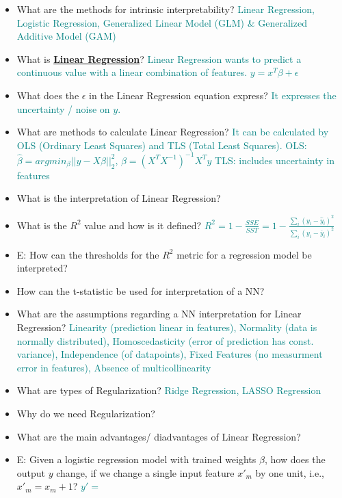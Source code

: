 \documentclass{report}
\newcommand{\asw}[2][teal]{}
\renewcommand{\asw}[2][teal]{\textcolor{#1}{#2}}
\begin{document}
	\begin{itemize}
	\item What are the methods for intrinsic interpretability?
	\asw{\newline Linear Regression, Logistic Regression, Generalized Linear Model (GLM) \& Generalized Additive Model (GAM)}
	
	\item What is \textbf{\underline{Linear Regression}}?
	\asw{\newline Linear Regression wants to predict a continuous value with a linear combination of features.
	\newline $y = x^T \beta + \epsilon$}
	\item What does the $\epsilon$ in the Linear Regression equation express?
	\asw{\newline It expresses the uncertainty / noise on $y$.}
	\item What are methods to calculate Linear Regression?
	\asw{\newline It can be calculated by OLS (Ordinary Least Squares) and TLS (Total Least Squares).
	\newline OLS: $\hat{\beta} = argmin_\beta ||y - X \beta||^2_2$, $\hat{\beta} = (X^T X^{-1})^{-1} X^T y$
	\newline TLS: includes uncertainty in features}
	\item What is the interpretation of Linear Regression?
	\asw{\newline }
	\item What is the $R^2$ value and how is it defined?
	\asw{\newline $R^2 = 1 - \frac{SSE}{SST} = 1 - \frac{\sum_{i} (y_i - \hat{y}_i)^2}{\sum_i (y_i - \overline{y}_i)^2}$}
	\item E: How can the thresholds for the $R^2$ metric for a regression model be interpreted?
	\asw{\newline }
	\item How can the t-statistic be used for interpretation of a NN?
	\asw{\newline }
	\item What are the assumptions regarding a NN interpretation for Linear Regression?
	\asw{\newline Linearity (prediction linear in features), Normality (data is normally distributed), Homoscedasticity (error of prediction has const. variance), Independence (of datapoints), Fixed Features (no measurment error in features), Absence of multicollinearity}
	\item What are types of Regularization?
	\asw{\newline Ridge Regression, LASSO Regression}
	\item Why do we need Regularization?
	\asw{\newline }
	\item What are the main advantages/ diadvantages of Linear Regression?
	\asw{\newline }
	\item E: Given a logistic regression model with trained weights $\beta$, how does the output $y$ change, if we change a single input feature $x'_m$ by one unit, i.e., $x'_m = x_m + 1$?
	\asw{\newline $y' = $}
	

\end{itemize}
\end{document}
